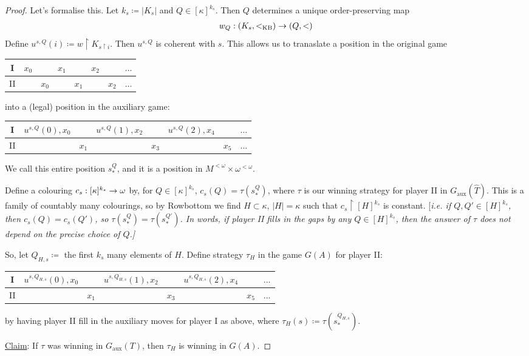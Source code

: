 \documentclass[]{article}
\newcommand{\om}{\omega}
\newcommand{\lom}{{<\omega}}
\newcommand{\aux}{\textrm{aux}}
\newcommand{\lkb}{<_{\textrm{KB}}}
\newcommand{\gamec}[2]{
    \begin{center}
        \begin{tabular}{c|ccccccc}
            I & $#1_0$ & & $#1_1$ & & $#1_2 $& & $\dots $\\ \hline
            II & & $#2_0$ & & $#2_1 $& &$ #2_2$ & $\dots$ 
        \end{tabular}
    \end{center}
}
\begin{document}
\begin{proof}
    Let's formalise this. Let $k_s \coloneqq |K_s|$ and $Q \in [\kappa]^{k_s}$. Then $Q$ determines a unique order-preserving map
    \begin{align*}
        w_Q :(K_s,\lkb)\ra (Q,<)
    \end{align*}
    Define $u^{s,Q}(i) \coloneqq w\restriction K_{s\restriction i}$. Then $u^{s,Q}$ is coherent with $s$. This allows us to tranaslate a position in the original game
    \gamec{x}{x}
    into a (legal) position in the auxiliary game:
    \begin{center}
        \begin{tabular}{c|ccccccc}
            I & $u^{s,Q}(0),x_0$ & & $u^{s,Q}(1),x_2$ & & $u^{s,Q}(2),x_4 $& & $\dots $\\ \hline
            II & & $x_1$ & & $x_3 $& &$ x_5$ & $\dots$ 
        \end{tabular}
    \end{center}
    We call this entire position $s^Q_\ast$, and it is a position in $M^\lom \times \om^\lom$.

    Define a colouring $c_s:[\kappa]^{k_s} \ra \om$ by, for $Q \in [\kappa]^{k_s}$, $c_s(Q) = \tau(s^Q_\ast)$, where $\tau$ is our winning strategy for player II in $G_\aux(\hat{T})$. This is a family of countably many colourings, so by Rowbottom we find $H\subset \kappa$, $|H| = \kappa$ such that $c_s\restriction [H]^{k_s}$ is constant. [\it{i.e.} if $Q,Q'\in [H]^{k_s}$, then $c_s(Q) = c_s(Q')$, so $\tau(s^Q_\ast) = \tau(s^{Q'}_\ast)$. In words, if player II fills in the gaps by \it{any} $Q \in [H]^{k_s}$, then the answer of $\tau$ does not depend on the precise choice of $Q$.]

    So, let $Q_{H,s} \coloneqq$ the first $k_s$ many elements of $H$. Define strategy $\tau_H$ in the game $G(A)$ for player II:
    \begin{center}
        \begin{tabular}{c|ccccccc}
            I & $u^{s,Q_{H,s}}(0),x_0$ & & $u^{s,Q_{H,s}}(1),x_2$ & & $u^{s,Q_{H,s}}(2),x_4 $& & $\dots $\\ \hline
            II & & $x_1$ & & $x_3 $& &$ x_5$ & $\dots$ 
        \end{tabular}
    \end{center}
    by having player II fill in the auxiliary moves for player I as above, where $\tau_H(s)\coloneqq \tau(s^{Q_{H,s}}_\ast)$.

    \underline{Claim}: If $\tau$ was winning in $G_\aux(T)$, then $\tau_H$ is winning in $G(A)$.


\end{proof}
\end{document}
